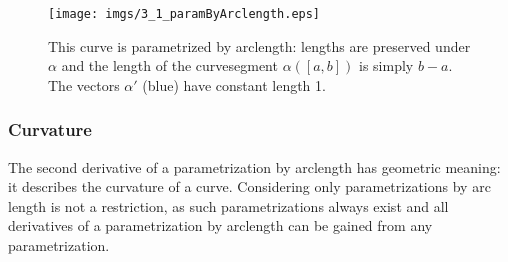 \begin{figure}[h]
\begin{center}
\texttt{[image: imgs/3\_1\_paramByArclength.eps]}
\end{center}
\caption{This curve is parametrized by arclength: lengths are preserved under $\alpha$ and the length of the curvesegment $\alpha([a,b])$ is simply $b-a$. The vectors $\alpha'$ (blue) have constant length 1.}
\label{fig::3_1_paramByArclength}
\end{figure}

\subsubsection{Curvature}
The second derivative of a parametrization by arclength has geometric meaning: it describes the curvature of a curve. Considering only parametrizations by arc length is not a restriction, as such parametrizations always exist and all derivatives of a parametrization by arclength can be gained from any parametrization.
	
